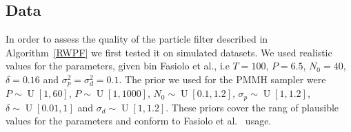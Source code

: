 \documentclass[12pt]{article}
\begin{document}
	\subsection{Data}
	In order to assess the quality of the particle filter described in Algorithm~\ref{RWPF} we first tested it on simulated datasets. We used realistic values for the parameters, given bin Fasiolo et al.\cite{fasiolo2014statistical}, i.e $T=100$, $P=6.5$, $N_0=40$, $\delta=0.16$ and $\sigma_p^2=\sigma_d^2=0.1$. The prior we used for the PMMH sampler were $P\sim\operatorname{U}[1, 60]$, $P\sim\operatorname{U}[1, 1000]$, $N_0\sim\operatorname{U}[0.1, 1.2]$, $\sigma_p\sim\operatorname{U}[1, 1.2]$, $\delta\sim\operatorname{U}[0.01, 1]$ and $\sigma_d\sim\operatorname{U}[1, 1.2]$. These priors cover the rang of plausible values for the parameters and conform to Fasiolo et al.~\cite{fasiolo2014statistical} usage.
	
\end{document}
